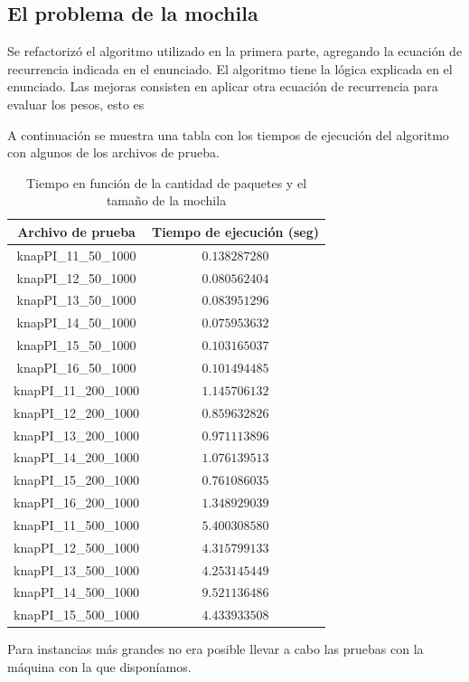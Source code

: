\documentclass[a4paper,10pt]{article}
\begin{document}
\subsection{El problema de la mochila}

Se refactorizó el algoritmo utilizado en la primera parte, agregando la ecuación de recurrencia indicada en el enunciado. El algoritmo tiene la lógica explicada en el enunciado. Las mejoras consisten en aplicar otra ecuación de  recurrencia para evaluar los pesos, esto es

A continuación se muestra una tabla con los tiempos de ejecución del algoritmo con algunos de los archivos de prueba.

\begin{table}[H]
\centering
\begin{tabular}{|c|c|}
\hline
Archivo de prueba	& Tiempo de ejecución (seg)\\\hline
knapPI\_11\_50\_1000	& $0.138287280$ \\\hline
knapPI\_12\_50\_1000	& $0.080562404$ \\\hline
knapPI\_13\_50\_1000	& $0.083951296$ \\\hline
knapPI\_14\_50\_1000	& $0.075953632$ \\\hline
knapPI\_15\_50\_1000	& $0.103165037$ \\\hline
knapPI\_16\_50\_1000	& $0.101494485$ \\\hline
knapPI\_11\_200\_1000	& $1.145706132$ \\\hline
knapPI\_12\_200\_1000	& $0.859632826$ \\\hline
knapPI\_13\_200\_1000	& $0.971113896$ \\\hline
knapPI\_14\_200\_1000	& $1.076139513$ \\\hline
knapPI\_15\_200\_1000	& $0.761086035$ \\\hline
knapPI\_16\_200\_1000	& $1.348929039$ \\\hline 
knapPI\_11\_500\_1000	& $5.400308580$ \\\hline 
knapPI\_12\_500\_1000	& $4.315799133$ \\\hline 
knapPI\_13\_500\_1000	& $4.253145449$ \\\hline 
knapPI\_14\_500\_1000	& $9.521136486$ \\\hline 
knapPI\_15\_500\_1000	& $4.433933508$ \\\hline 
\end{tabular}
\caption{Tiempo en función de la cantidad de paquetes y el tamaño de la mochila}
\label{tab:held}
\end{table}

Para instancias más grandes no era posible llevar a cabo las pruebas con la máquina con la que disponíamos.
\end{document}

